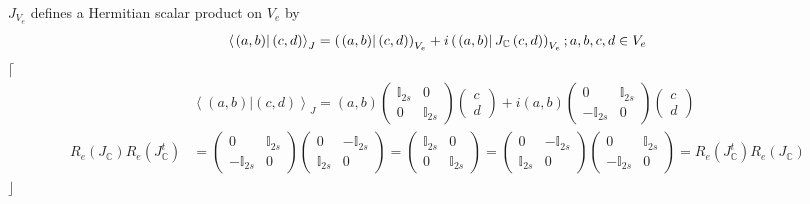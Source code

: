 \documentclass[aps,preprint]{revtex4}
\begin{document}
$J_{V_{e}}$ defines a Hermitian scalar product on $V_{e}$ by 
\begin{equation}
\left\langle \left. \left( a,b\right) \right\vert \left( c,d\right)
\right\rangle _{J}=\left( \left. \left( a,b\right) \right\vert \left(
c,d\right) \right) _{V_{e}}+i\left( \left. \left( a,b\right) \right\vert J_{%
\mathbb{C}}\left( c,d\right) \right) _{V_{e}};a,b,c,d\in V_{e}
\end{equation}
$\lceil$%
\begin{align}
& \left\langle \left. \left( a,b\right) \right\vert \left( c,d\right)
\right\rangle _{J}=\left( a,b\right) \left( 
\begin{array}{cc}
\mathbb{I}_{2s} & 0 \\ 
0 & \mathbb{I}_{2s}%
\end{array}
\right) \left( 
\begin{array}{c}
c \\ 
d%
\end{array}
\right) +i\left( a,b\right) \left( 
\begin{array}{cc}
0 & \mathbb{I}_{2s} \\ 
-\mathbb{I}_{2s} & 0%
\end{array}
\right) \left( 
\begin{array}{c}
c \\ 
d%
\end{array}
\right) \\
R_{e}\left( J_{\mathbb{C}}\right) R_{e}\left( J_{\mathbb{C}}^{t}\right) &
=\left( 
\begin{array}{cc}
0 & \mathbb{I}_{2s} \\ 
-\mathbb{I}_{2s} & 0%
\end{array}
\right) \left( 
\begin{array}{cc}
0 & -\mathbb{I}_{2s} \\ 
\mathbb{I}_{2s} & 0%
\end{array}
\right) =\left( 
\begin{array}{cc}
\mathbb{I}_{2s} & 0 \\ 
0 & \mathbb{I}_{2s}%
\end{array}
\right) =\left( 
\begin{array}{cc}
0 & -\mathbb{I}_{2s} \\ 
\mathbb{I}_{2s} & 0%
\end{array}
\right) \left( 
\begin{array}{cc}
0 & \mathbb{I}_{2s} \\ 
-\mathbb{I}_{2s} & 0%
\end{array}
\right) =R_{e}\left( J_{\mathbb{C}}^{t}\right) R_{e}\left( J_{\mathbb{C}%
}\right)
\end{align}
$\rfloor$
\end{document}
